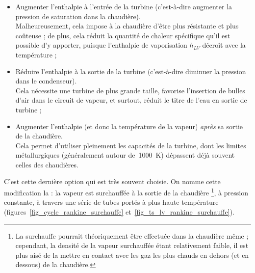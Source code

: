 		\begin{itemize}
			\item Augmenter l’enthalpie à l’entrée de la turbine (c’est-à-dire augmenter la pression de saturation dans la chaudière). \\
			Malheureusement, cela impose à la chaudière d’être plus résistante et plus coûteuse ; de plus, cela réduit la quantité de chaleur spécifique qu’il est possible d’y apporter, puisque l’enthalpie de vaporisation $h_{LV}$ décroît avec la température ;

			\item Réduire l’enthalpie à la sortie de la turbine (c’est-à-dire diminuer la pression dans le condenseur). \\
			Cela nécessite une turbine de plus grande taille,  favorise l’insertion de bulles d’air dans le circuit de vapeur, et surtout, réduit le titre de l’eau en sortie de turbine ;

			\item Augmenter l’enthalpie (et donc la température de la vapeur) \emph{après} sa sortie de la chaudière.\\
			Cela permet d’utiliser pleinement les capacités de la turbine, dont les limites métallurgiques (généralement autour de~\SI{1000}{\kelvin}) dépassent déjà souvent celles des chaudières.
		\end{itemize}

		C’est cette dernière option qui est très souvent choisie. On nomme cette modification la  : la vapeur est surchauffée à la sortie de la chaudière%
		\footnote{La surchauffe pourrait théoriquement être effectuée dans la chaudière même ; cependant, la densité de la vapeur surchauffée étant relativement faible, il est plus aisé de la mettre en contact avec les gaz les plus chauds en dehors (et en dessous) de la chaudière.}, à pression constante, à travers une série de tubes portés à plus haute température (figures~\ref{fig_cycle_rankine_surchauffe} et~\ref{fig_ts_lv_rankine_surchauffe}).


